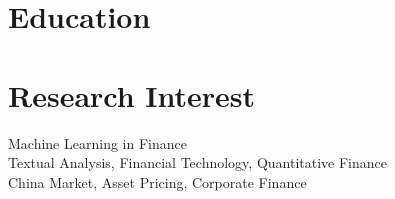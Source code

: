 \documentclass{clean_cv}
\begin{document}
\section{Education}

\begin{datetabular}{9em}


\end{datetabular}

\section{Research Interest}
\begin{center}
	Machine Learning in Finance \\
	Textual Analysis, Financial Technology, Quantitative Finance \\ 
	China Market, Asset Pricing, Corporate Finance
\end{center}

%
\end{document}
